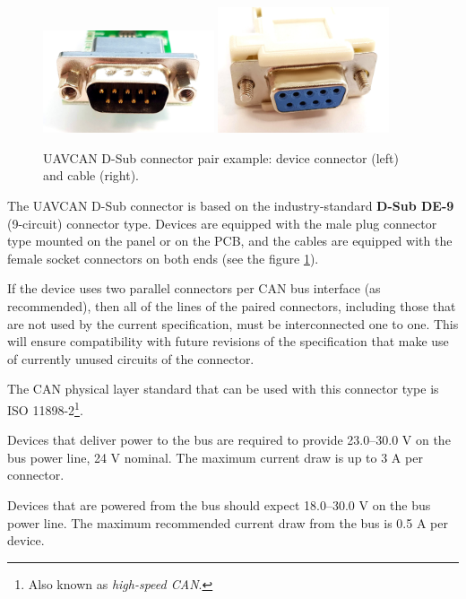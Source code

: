 \begin{figure}[hbt]
    \centering
    \includegraphics[width=0.45\textwidth]{transport_layer/de-9_connector_male_plug}
    \includegraphics[width=0.45\textwidth]{transport_layer/de-9_cable_female_socket}
    \caption{UAVCAN D-Sub connector pair example: device connector (left) and cable (right).
    \label{fig:can_uavcan_d_sub_connector_example}}
\end{figure}

The UAVCAN D-Sub connector is based on the industry-standard \textbf{D-Sub DE-9} (9-circuit) connector type.
Devices are equipped with the male plug connector type mounted on the panel or on the PCB,
and the cables are equipped with the female socket connectors on both ends
(see the figure \ref{fig:can_uavcan_d_sub_connector_example}).

If the device uses two parallel connectors per CAN bus interface (as recommended),
then all of the lines of the paired connectors,
including those that are not used by the current specification,
must be interconnected one to one.
This will ensure compatibility with future revisions of the specification that make use of
currently unused circuits of the connector.

The CAN physical layer standard that can be used with this connector type is
ISO 11898-2\footnote{Also known as \emph{high-speed CAN}.}.

Devices that deliver power to the bus are required to provide 23.0--30.0 V on the bus power line, 24 V nominal.
The maximum current draw is up to 3 A per connector.

Devices that are powered from the bus should expect 18.0--30.0 V on the bus power line.
The maximum recommended current draw from the bus is 0.5 A per device.

